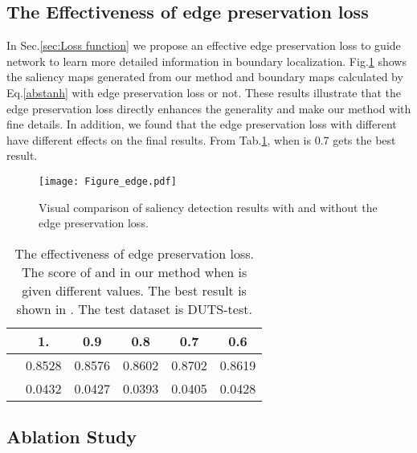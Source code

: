 \documentclass[10pt,twocolumn,letterpaper]{article}
\begin{document}
\subsection{The Effectiveness of edge preservation loss}
In Sec.\ref{sec:Loss function} we propose an effective edge preservation loss to guide network to learn more detailed information in boundary localization. Fig.\ref{fig:edg} shows the saliency maps generated from our method and boundary maps calculated by Eq.\ref{abstanh} with edge preservation loss or not. These results illustrate that the edge preservation loss directly enhances the generality and make our method with fine details. In addition, we found that the edge preservation loss with different  have different effects on the final results. From Tab.\ref{tab:bili}, when  is 0.7 gets the best result.

\begin{figure}[t]
\centering
\texttt{[image: Figure\_edge.pdf]}
\caption{Visual comparison of saliency detection results with and without the edge preservation loss.}
\label{fig:edg}
\end{figure}

\begin{table}[t]
\begin{center}
\begin{tabular}{|l c c c c c|}
\hline
 & 1. & 0.9 & 0.8 & 0.7 & 0.6 \\\hline
 & 0.8528 & 0.8576 & 0.8602 & {\color{red}0.8702} &0.8619 \\
 &  0.0432 & 0.0427 & {\color{red}0.0393} & 0.0405 & 0.0428\\
\hline 
\end{tabular}
\end{center}
\caption{The effectiveness of edge preservation loss. The score of  and  in our method when  is given different values.  The best result is shown in {\color{red}{red}}. The test dataset is DUTS-test. }
\label{tab:bili}
\end{table}

\subsection{Ablation Study}
\end{document}
